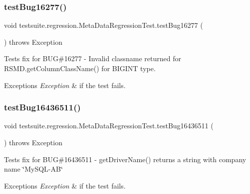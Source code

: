 \subsubsection{\texorpdfstring{test\+Bug16277()}{testBug16277()}}
{\footnotesize\ttfamily void testsuite.\+regression.\+Meta\+Data\+Regression\+Test.\+test\+Bug16277 (\begin{DoxyParamCaption}{ }\end{DoxyParamCaption}) throws Exception}

Tests fix for B\+UG\#16277 -\/ Invalid classname returned for R\+S\+M\+D.\+get\+Column\+Class\+Name() for B\+I\+G\+I\+NT type.


\begin{DoxyExceptions}{Exceptions}
{\em Exception} & if the test fails. \\
\hline
\end{DoxyExceptions}
\mbox{\label{classtestsuite_1_1regression_1_1_meta_data_regression_test_a1fd3d694ae818586b9e77cceb5bfbbb3}} 
\subsubsection{\texorpdfstring{test\+Bug16436511()}{testBug16436511()}}
{\footnotesize\ttfamily void testsuite.\+regression.\+Meta\+Data\+Regression\+Test.\+test\+Bug16436511 (\begin{DoxyParamCaption}{ }\end{DoxyParamCaption}) throws Exception}

Tests fix for B\+UG\#16436511 -\/ get\+Driver\+Name() returns a string with company name \char`\"{}\+My\+S\+Q\+L-\/\+A\+B\char`\"{}


\begin{DoxyExceptions}{Exceptions}
{\em Exception} & if the test fails. \\
\hline
\end{DoxyExceptions}
\mbox{\label{classtestsuite_1_1regression_1_1_meta_data_regression_test_a5eb8eb8d010b18e3193a85380d5483ba}} 
